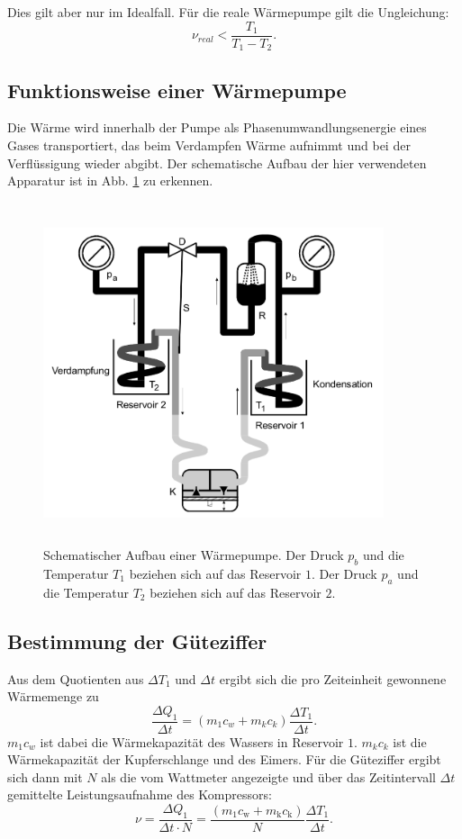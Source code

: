 \noindent Dies gilt aber nur im Idealfall. Für die reale Wärmepumpe gilt die 
Ungleichung:
\begin{equation*}
    \nu_{real} < \frac{T_1}{T_1-T_2}.
\end{equation*}

\subsection{Funktionsweise einer Wärmepumpe}
Die Wärme wird innerhalb der Pumpe als Phasenumwandlungsenergie eines Gases 
transportiert, das beim Verdampfen Wärme aufnimmt und bei der Verflüssigung wieder 
abgibt. Der schematische Aufbau der hier verwendeten Apparatur ist in Abb. \ref{fig:aufbau1} zu 
erkennen.
\begin{figure}
    \centering
    \includegraphics[width=10cm, height=10cm]{build/1.png}
    \caption{Schematischer Aufbau einer Wärmepumpe. Der Druck $p_b$ und die Temperatur
    $T_1$ beziehen sich auf das Reservoir $\num{1}$. Der Druck $p_a$ und die Temperatur
$T_2$ beziehen sich auf das Reservoir $\num{2}$.\cite{V206}}
    \label{fig:aufbau1}
\end{figure}

\subsection{Bestimmung der Güteziffer}
Aus dem Quotienten aus $\Delta T_1$ und $\Delta t$ ergibt sich die pro Zeiteinheit 
gewonnene Wärmemenge zu
\begin{equation*}
    \frac{\Delta Q_1}{\Delta t} = (m_1 c_w + m_k c_k)\frac{\Delta T_1}{\Delta t}.
    \label{eqn:Q1}
\end{equation*}
$m_1 c_w$ ist dabei die Wärmekapazität des Wassers in Reservoir $\num{1}$. $m_k c_k$ ist die 
Wärmekapazität der Kupferschlange und des Eimers. Für die Güteziffer ergibt sich dann 
mit $N$ als die vom Wattmeter angezeigte und über das Zeitintervall $\Delta t$ 
gemittelte Leistungsaufnahme des Kompressors:
\begin{equation}
    \nu = \frac{\Delta Q_1}{\Delta t \cdot N} = \frac{(m_1 c_\text{w} + m_\text{k} c_\text{k})}{N} \frac{\Delta T_1}{\Delta t}.
    \label{eqn:güteziffer}
\end{equation}

